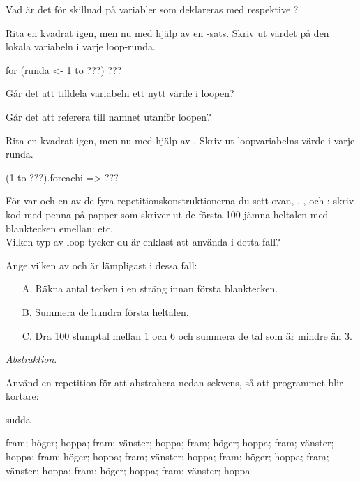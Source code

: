 \Subtask\Pen Vad är det för skillnad på variabler som deklareras med  respektive ? 

\Subtask Rita en kvadrat igen, men nu med hjälp av en -sats. Skriv ut värdet på den lokala variabeln  i varje loop-runda.

\begin{Code}
for (runda <- 1 to ???) { ??? }
\end{Code}

\Subtask\Pen Går det att tilldela variabeln  ett nytt värde i loopen? 

\Subtask\Pen Går det att referera till namnet  utanför loopen? 


\Subtask Rita en kvadrat igen, men nu med hjälp av . Skriv ut loopvariabelns värde i varje runda.

\begin{Code}
(1 to ???).foreach{i => ???}
\end{Code}

\Subtask\Pen För var och en av de fyra repetitionskonstruktionerna du sett ovan, , ,  och : skriv kod med penna på papper som skriver ut de första 100 jämna heltalen med blanktecken emellan:  etc.\\
Vilken typ av loop tycker du är enklast att använda i detta fall?

\Subtask\Pen Ange vilken av  och  är lämpligast i dessa fall:
\begin{itemize}[noitemsep, nolistsep]
\item[A.] Räkna antal tecken i en sträng innan första blanktecken. 
\item[B.] Summera de hundra första heltalen. 
\item[C.] Dra 100 slumptal mellan 1 och 6 och summera de tal som är mindre än 3.
\end{itemize}




\Task \textit{Abstraktion}.

\Subtask Använd en repetition för att abstrahera nedan sekvens, så att programmet blir kortare:
\begin{Code}
sudda

fram; höger; hoppa; fram; vänster; hoppa; fram; höger;
hoppa; fram; vänster; hoppa; fram; höger; hoppa; fram;
vänster; hoppa; fram; höger; hoppa; fram; vänster; hoppa;
fram; höger; hoppa; fram; vänster; hoppa
\end{Code}

